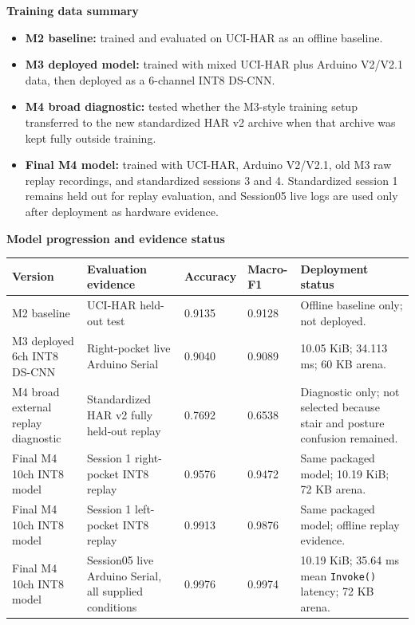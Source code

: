\documentclass[11pt,a4paper]{article}
\newcommand{\term}[1]{\textbf{#1}}
\begin{document}
\textbf{Training data summary}

\begin{itemize}
\item \term{M2 baseline:} trained and evaluated on UCI-HAR as an offline baseline.
\item \term{M3 deployed model:} trained with mixed UCI-HAR plus Arduino V2/V2.1 data, then deployed as a 6-channel INT8 DS-CNN.
\item \term{M4 broad diagnostic:} tested whether the M3-style training setup transferred to the new standardized HAR v2 archive when that archive was kept fully outside training.
\item \term{Final M4 model:} trained with UCI-HAR, Arduino V2/V2.1, old M3 raw replay recordings, and standardized sessions 3 and 4. Standardized session 1 remains held out for replay evaluation, and Session05 live logs are used only after deployment as hardware evidence.
\end{itemize}

\textbf{Model progression and evidence status}

\begin{center}
\small
\begin{tabular}{|p{2.9cm}|p{3.2cm}|p{1.7cm}|p{1.7cm}|p{4.1cm}|}
\hline
\rowcolor{headergray}
\textbf{Version} & \textbf{Evaluation evidence} & \textbf{Accuracy} & \textbf{Macro-F1} & \textbf{Deployment status}\\
\hline
M2 baseline & UCI-HAR held-out test & 0.9135 & 0.9128 & Offline baseline only; not deployed.\\
\hline
M3 deployed 6ch INT8 DS-CNN & Right-pocket live Arduino Serial & 0.9040 & 0.9089 & 10.05 KiB; 34.113 ms; 60 KB arena.\\
\hline
M4 broad external replay diagnostic & Standardized HAR v2 fully held-out replay & 0.7692 & 0.6538 & Diagnostic only; not selected because stair and posture confusion remained.\\
\hline
Final M4 10ch INT8 model & Session 1 right-pocket INT8 replay & 0.9576 & 0.9472 & Same packaged model; 10.19 KiB; 72 KB arena.\\
\hline
Final M4 10ch INT8 model & Session 1 left-pocket INT8 replay & 0.9913 & 0.9876 & Same packaged model; offline replay evidence.\\
\hline
Final M4 10ch INT8 model & Session05 live Arduino Serial, all supplied conditions & 0.9976 & 0.9974 & 10.19 KiB; 35.64 ms mean \texttt{Invoke()} latency; 72 KB arena.\\
\hline
\end{tabular}
\end{center}
\normalsize
\end{document}
